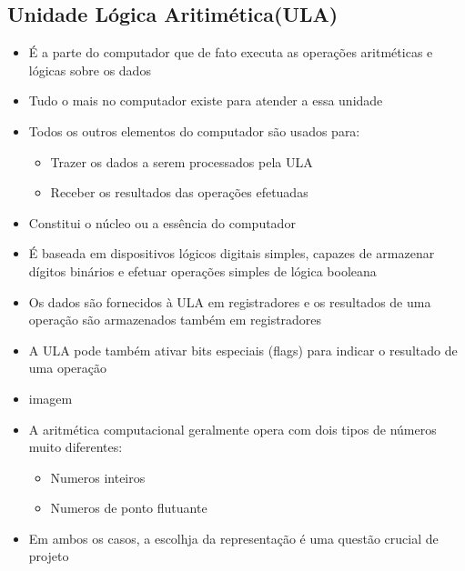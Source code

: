 \documentclass[12pt]{article}
\begin{document}
    \subsection{Unidade Lógica Aritimética(ULA)}
    \begin{itemize}
        \item É a parte do computador que de fato executa as operações 
        aritméticas e lógicas sobre os dados
        \item Tudo o mais no computador existe para atender a essa unidade
        \item Todos os outros elementos do computador são usados para:
        \begin{itemize}
            \item Trazer os dados a serem processados pela ULA
            \item Receber os resultados das operações efetuadas
        \end{itemize}
        \item Constitui o núcleo ou a essência do computador 
        \item É baseada em dispositivos lógicos digitais simples, capazes 
        de armazenar dígitos binários e efetuar operações simples de lógica 
        booleana
        \item Os dados são fornecidos à ULA em registradores e os 
        resultados de uma operação são armazenados também em registradores
        \item A ULA pode também ativar bits especiais (flags) para indicar 
        o resultado de uma operação 
        \item[] imagem
        \item A aritmética computacional geralmente opera com dois tipos de 
        números muito diferentes:
        \begin{itemize}
            \item Numeros inteiros
            \item Numeros de ponto flutuante
        \end{itemize}
        \item Em ambos os casos, a escolhja da representação é uma questão 
        crucial de projeto
    \end{itemize}
\end{document}
